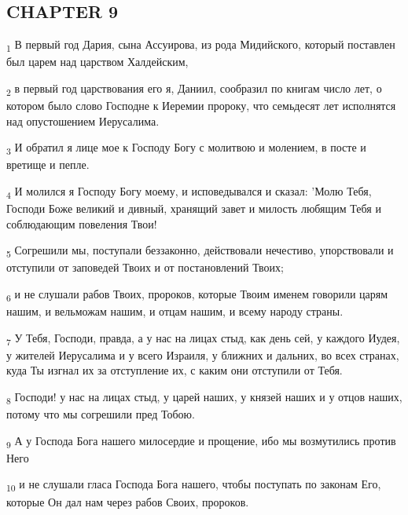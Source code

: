 \subsection{CHAPTER 9}
\begin{tcolorbox}
\textsubscript{1} В первый год Дария, сына Ассуирова, из рода Мидийского, который поставлен был царем над царством Халдейским,
\end{tcolorbox}
\begin{tcolorbox}
\textsubscript{2} в первый год царствования его я, Даниил, сообразил по книгам число лет, о котором было слово Господне к Иеремии пророку, что семьдесят лет исполнятся над опустошением Иерусалима.
\end{tcolorbox}
\begin{tcolorbox}
\textsubscript{3} И обратил я лице мое к Господу Богу с молитвою и молением, в посте и вретище и пепле.
\end{tcolorbox}
\begin{tcolorbox}
\textsubscript{4} И молился я Господу Богу моему, и исповедывался и сказал: 'Молю Тебя, Господи Боже великий и дивный, хранящий завет и милость любящим Тебя и соблюдающим повеления Твои!
\end{tcolorbox}
\begin{tcolorbox}
\textsubscript{5} Согрешили мы, поступали беззаконно, действовали нечестиво, упорствовали и отступили от заповедей Твоих и от постановлений Твоих;
\end{tcolorbox}
\begin{tcolorbox}
\textsubscript{6} и не слушали рабов Твоих, пророков, которые Твоим именем говорили царям нашим, и вельможам нашим, и отцам нашим, и всему народу страны.
\end{tcolorbox}
\begin{tcolorbox}
\textsubscript{7} У Тебя, Господи, правда, а у нас на лицах стыд, как день сей, у каждого Иудея, у жителей Иерусалима и у всего Израиля, у ближних и дальних, во всех странах, куда Ты изгнал их за отступление их, с каким они отступили от Тебя.
\end{tcolorbox}
\begin{tcolorbox}
\textsubscript{8} Господи! у нас на лицах стыд, у царей наших, у князей наших и у отцов наших, потому что мы согрешили пред Тобою.
\end{tcolorbox}
\begin{tcolorbox}
\textsubscript{9} А у Господа Бога нашего милосердие и прощение, ибо мы возмутились против Него
\end{tcolorbox}
\begin{tcolorbox}
\textsubscript{10} и не слушали гласа Господа Бога нашего, чтобы поступать по законам Его, которые Он дал нам через рабов Своих, пророков.
\end{tcolorbox}
